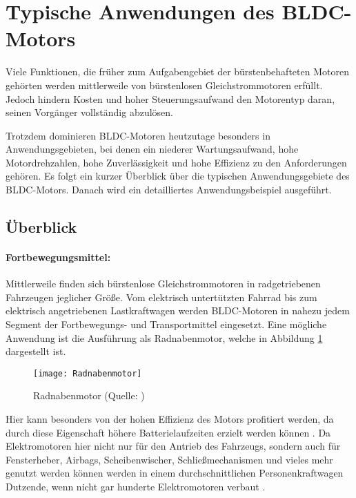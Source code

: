 \section{Typische Anwendungen des BLDC-Motors}

Viele Funktionen, die früher zum Aufgabengebiet der bürstenbehafteten Motoren gehörten werden mittlerweile von bürstenlosen Gleichstrommotoren erfüllt. Jedoch hindern Kosten und hoher Steuerungsaufwand den Motorentyp daran, seinen Vorgänger vollständig abzulösen.

Trotzdem dominieren BLDC-Motoren heutzutage besonders in Anwendungsgebieten, bei denen ein niederer Wartungsaufwand, hohe Motordrehzahlen, hohe Zuverlässigkeit und hohe Effizienz zu den Anforderungen gehören. Es folgt ein kurzer Überblick über die typischen Anwendungsgebiete des BLDC-Motors. Danach wird ein detailliertes Anwendungsbeispiel ausgeführt.

\subsection{Überblick}

\paragraph{Fortbewegungsmittel:} Mittlerweile finden sich bürstenlose Gleichstrommotoren in radgetriebenen Fahrzeugen jeglicher Größe. Vom elektrisch untertützten Fahrrad \parencite[S.6]{Xia2012} bis zum elektrisch angetriebenen Lastkraftwagen werden BLDC-Motoren in nahezu jedem Segment der Fortbewegungs- und Transportmittel eingesetzt. Eine mögliche Anwendung ist die Ausführung als Radnabenmotor, welche in Abbildung \ref{fig:Radnabenmotor} dargestellt ist.
\begin{figure}[h]
  \centering
  \texttt{[image: Radnabenmotor]}
  \caption[Radnabenmotor]{Radnabenmotor (Quelle: \parencite[S.132]{Babiel2014})}
  \label{fig:Radnabenmotor}
\end{figure}
Hier kann besonders von der hohen Effizienz des Motors profitiert werden, da durch diese Eigenschaft höhere Batterielaufzeiten erzielt werden können \parencite[S.4]{Xia2012}. Da Elektromotoren hier nicht nur für den Antrieb des Fahrzeugs, sondern auch für Fensterheber, Airbags, Scheibenwischer, Schließmechanismen und vieles mehr genutzt werden können werden in einem durchschnittlichen Personenkraftwagen Dutzende, wenn nicht gar hunderte Elektromotoren verbaut \parencite[S.4]{Xia2012}.

